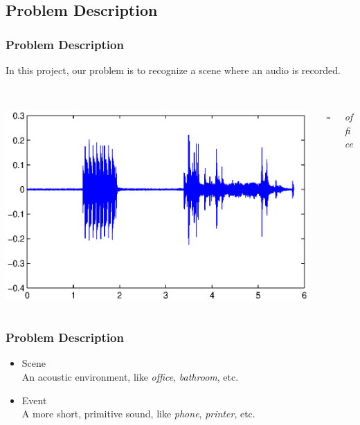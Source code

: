 \documentclass[xcolor=table,slidestop,compress,mathserif]{beamer}
\begin{document}
\subsection{Problem Description}
\begin{frame}
  \frametitle{Problem Description}
	In this project, our problem is to recognize a scene where an audio is recorded. \\ 
	
	 \\

	\pause
	\vspace{0.5cm}
	\begin{columns}[c]
		\begin{column}{0.5\textwidth}
			\includegraphics[scale=0.4]{./figure/office.eps}
		\end{column}
		\begin{column}{0.05\textwidth}
			\centering
			$\Rightarrow$
		\end{column}
		\begin{column}{0.45\textwidth}
			\em{office}
		\end{column}
	\end{columns}

\end{frame}
\begin{frame}
	\frametitle{Problem Description}
	\begin{itemize}
		\item{Scene\\} 
		An acoustic environment, like \textit{office}, \textit{bathroom}, etc. \\ 
		\item{Event\\} 
		A more short, primitive sound, like \textit{phone}, \textit{printer}, etc.
	\end{itemize}
\end{frame}
\end{document}
